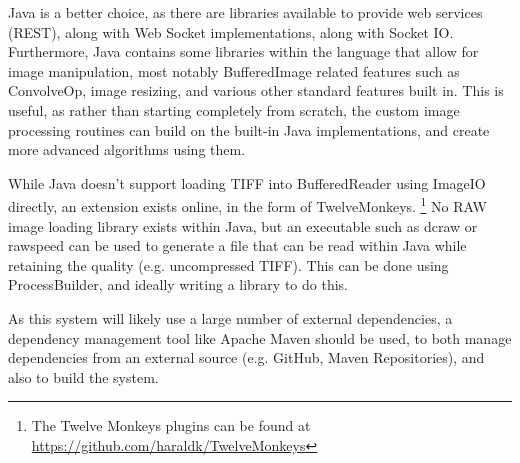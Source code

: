 \documentclass[12pt,a4paper]{article}
\begin{document}
Java is a better choice, as there are libraries available to provide web services (REST), along with Web Socket implementations, along with Socket IO. Furthermore, Java contains some libraries within the language that allow for image manipulation, most notably
BufferedImage related features such as ConvolveOp, image resizing, and various other standard features built in. This is useful, as rather than starting completely from scratch, the custom image processing routines can build on the built-in Java implementations, and create more advanced algorithms using them.

While Java doesn't support loading TIFF into BufferedReader using ImageIO directly, an extension exists online, in the form of TwelveMonkeys. \footnote{The Twelve Monkeys plugins can be found at \url{https://github.com/haraldk/TwelveMonkeys}} No RAW image loading library
exists within Java, but an executable such as dcraw or rawspeed can be used to generate a file that can be read within Java while retaining the quality (e.g. uncompressed TIFF). This can be done
using ProcessBuilder, and ideally writing a library to do this.

As this system will likely use a large number of external dependencies, a dependency management tool
like Apache Maven should be used, to both manage dependencies from an external source (e.g. GitHub, Maven
Repositories), and also to build the system.
\end{document}
